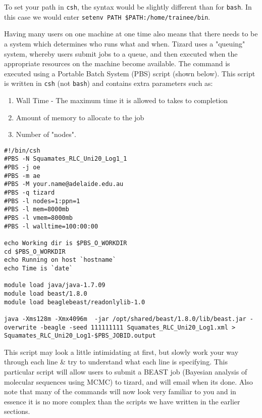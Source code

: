 To set your path in \texttt{csh}, the syntax would be slightly different than for \texttt{bash}.
In this case we would enter \texttt{setenv PATH \$PATH:/home/trainee/bin}.

\begin{information}
Having many users on one machine at one time also means that there needs to be a system which determines who runs what and when. 
Tizard uses a "queuing" system, whereby users submit jobs to a queue, and then executed when the appropriate resources on the machine become available. 
The command is executed using a Portable Batch System (PBS) script (shown below). 
This script is written in \texttt{csh} (not \texttt{bash}) and contains extra parameters such as:
\begin{enumerate}
\item Wall Time - The maximum time it is allowed to takes to completion
\item Amount of memory to allocate to the job
\item Number of "nodes". 
\end{enumerate}

\begin{lstlisting}
#!/bin/csh
#PBS -N Squamates_RLC_Uni20_Log1_1
#PBS -j oe
#PBS -m ae
#PBS -M your.name@adelaide.edu.au
#PBS -q tizard
#PBS -l nodes=1:ppn=1
#PBS -l mem=8000mb
#PBS -l vmem=8000mb
#PBS -l walltime=100:00:00

echo Working dir is $PBS_O_WORKDIR
cd $PBS_O_WORKDIR
echo Running on host `hostname`
echo Time is `date`

module load java/java-1.7.09
module load beast/1.8.0
module load beaglebeast/readonlylib-1.0

java -Xms128m -Xmx4096m  -jar /opt/shared/beast/1.8.0/lib/beast.jar -overwrite -beagle -seed 111111111 Squamates_RLC_Uni20_Log1.xml > Squamates_RLC_Uni20_Log1-$PBS_JOBID.output
\end{lstlisting}

This script may look a little intimidating at first, but slowly work your way through each line \& try to understand what each line is specifying.
This particular script will allow users to submit a BEAST job (Bayesian analysis of molecular sequences using MCMC) to tizard, and will email when its done.
Also note that many of the commands will now look very familiar to you and in essence it is no more complex than the scripts we have written in the earlier sections.
\end{information}
